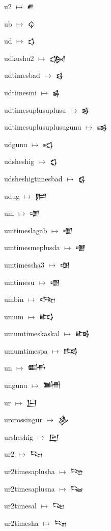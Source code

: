 {\noindent u2 $\mapsto$ {\cufont 𒌑}\par
\noindent ub $\mapsto$ {\cufont 𒌒}\par
\noindent ud $\mapsto$ {\cufont 𒌓}\par
\noindent udkushu2 $\mapsto$ {\cufont 𒌔}\par
\noindent udtimesbad $\mapsto$ {\cufont 𒌕}\par
\noindent udtimesmi $\mapsto$ {\cufont 𒌖}\par
\noindent udtimesuplusuplusu $\mapsto$ {\cufont 𒌗}\par
\noindent udtimesuplusuplusugunu $\mapsto$ {\cufont 𒌘}\par
\noindent udgunu $\mapsto$ {\cufont 𒌙}\par
\noindent udsheshig $\mapsto$ {\cufont 𒌚}\par
\noindent udsheshigtimesbad $\mapsto$ {\cufont 𒌛}\par
\noindent udug $\mapsto$ {\cufont 𒌜}\par
\noindent um $\mapsto$ {\cufont 𒌝}\par
\noindent umtimeslagab $\mapsto$ {\cufont 𒌞}\par
\noindent umtimesmeplusda $\mapsto$ {\cufont 𒌟}\par
\noindent umtimessha3 $\mapsto$ {\cufont 𒌠}\par
\noindent umtimesu $\mapsto$ {\cufont 𒌡}\par
\noindent umbin $\mapsto$ {\cufont 𒌢}\par
\noindent umum $\mapsto$ {\cufont 𒌣}\par
\noindent umumtimeskaskal $\mapsto$ {\cufont 𒌤}\par
\noindent umumtimespa $\mapsto$ {\cufont 𒌥}\par
\noindent un $\mapsto$ {\cufont 𒌦}\par
\noindent ungunu $\mapsto$ {\cufont 𒌧}\par
\noindent ur $\mapsto$ {\cufont 𒌨}\par
\noindent urcrossingur $\mapsto$ {\cufont 𒌩}\par
\noindent ursheshig $\mapsto$ {\cufont 𒌪}\par
\noindent ur2 $\mapsto$ {\cufont 𒌫}\par
\noindent ur2timesaplusha $\mapsto$ {\cufont 𒌬}\par
\noindent ur2timesaplusna $\mapsto$ {\cufont 𒌭}\par
\noindent ur2timesal $\mapsto$ {\cufont 𒌮}\par
\noindent ur2timesha $\mapsto$ {\cufont 𒌯}\par
}
